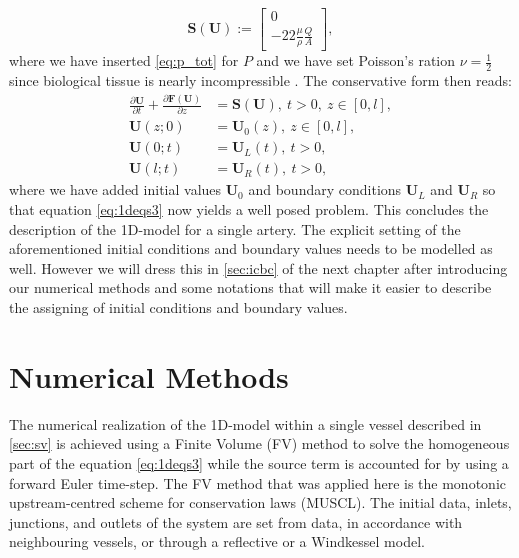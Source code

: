 \documentclass[a4paper, oneside]{discothesis}
\begin{document}
\begin{equation}
	\mathbf{S} \left( \mathbf{U} \right) := 
	\begin{bmatrix}
		0 \\
	-22\frac{\mu}{\rho}\frac{Q}{A} 
	\end{bmatrix},
\end{equation}
where we have inserted \autoref{eq:p_tot} for $P$ and we have set Poisson's ration $\nu = \frac{1}{2}$ since biological tissue is nearly incompressible \cite{sherwin2003one}.
The conservative form then reads:
\begin{equation}
	\begin{aligned}
		\frac{\partial \mathbf{U}}{\partial t} + \frac{\partial \mathbf{F} \left( \mathbf{U} \right)}{\partial z} &= \mathbf{S} \left( \mathbf{U} \right), \ t>0, \ z \in \left[ 0,l \right], \\
		\mathbf{U} \left( z;0 \right) &= \mathbf{U}_0 \left( z \right), \ z \in \left[ 0,l \right], \\
		\mathbf{U} \left( 0;t \right) &= \mathbf{U}_L \left( t \right), \ t>0,\\
		\mathbf{U} \left( l;t \right) &= \mathbf{U}_R \left( t \right), \ t>0,
	\end{aligned} \label{eq:1deqs3}
\end{equation}
where we have added initial values $\mathbf{U}_0$ and boundary conditions $\mathbf{U}_L$ and $\mathbf{U}_R$ so that equation \ref{eq:1deqs3} now yields a well posed problem.\cite{formaggia2010cardiovascular}
This concludes the description of the 1D-model for a single artery.
The explicit setting of the aforementioned initial conditions and boundary values needs to be modelled as well.
However we will dress this in \autoref{sec:icbc} of the next chapter after introducing our numerical methods and some notations that will make it easier to describe the assigning of initial conditions and boundary values.





\chapter{Numerical Methods} \label{chap:nm}
The numerical realization of the 1D-model within a single vessel described in \autoref{sec:sv} is achieved using a Finite Volume (FV) method to solve the homogeneous part of the equation \autoref{eq:1deqs3} while the source term is accounted for by using a forward Euler time-step. 
The FV method that was applied here is the monotonic upstream-centred scheme for conservation laws (MUSCL).
The initial data, inlets, junctions, and outlets of the system are set from data, in accordance with neighbouring vessels, or through a reflective or a Windkessel model.
\end{document}
